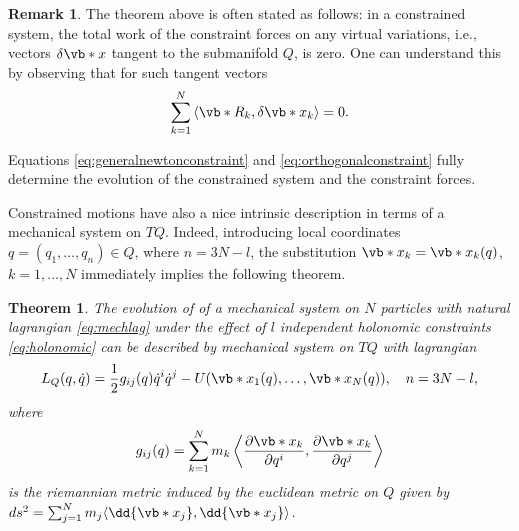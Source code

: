 \documentclass[english,fontsize=11pt,paper=b5]{scrbook}
\numberwithin{equation}{chapter}
\newtheorem{theorem}{Theorem}[chapter]
\theoremstyle{definition}
\newtheorem{remark}{Remark}[chapter]
\begin{document}
    \begin{remark}
      The theorem above is often stated as follows: in a constrained system, the total work of the constraint forces on any virtual variations, i.e., vectors $\delta\vb*{x}$ tangent to the submanifold $Q$, is zero.
      One can understand this by observing that for such tangent vectors
      \begin{equation}\label{eq:orthogonalconstraint}
        \sum_{k=1}^N \left\langle\vb*{R}_k, \delta\vb*{x}_k\right\rangle = 0.
      \end{equation}
    \end{remark}

    Equations \eqref{eq:generalnewtonconstraint} and \eqref{eq:orthogonalconstraint} fully determine the evolution of the constrained system and the constraint forces.

    Constrained motions have also a nice intrinsic description in terms of a mechanical system on $TQ$. Indeed, introducing local coordinates $q= (q_1, \ldots, q_n)\in Q$, where $n = 3N-l$, the substitution $\vb*{x}_k = \vb*{x}_k(q)$, $k=1,\ldots,N$ immediately implies the following theorem.

    \begin{theorem}
      The evolution of of a mechanical system on $N$ particles with natural lagrangian \eqref{eq:mechlag} under the effect of $l$ independent holonomic constraints \eqref{eq:holonomic} can be described by mechanical system on $TQ$ with lagrangian
      \begin{equation}
        L_Q(q,\dot q) = \frac12 g_{ij}(q)\dot q^i \dot q^j - U(\vb*{x}_1(q),\ldots,\vb*{x}_N(q)), \quad n = 3N-l,
      \end{equation}
      where
      \begin{equation}
        g_{ij}(q) = \sum_{k=1}^N m_k\left\langle\frac{\partial \vb*{x}_k}{\partial q^i},\frac{\partial \vb*{x}_k}{\partial q^j}\right\rangle
      \end{equation}
      is the riemannian metric induced by the euclidean metric on $Q$ given by
      $ds^2 = \sum_{j=1}^N m_j\langle\dd{\vb*{x}_j}, \dd{\vb*{x}_j}\rangle$.
    \end{theorem}
\end{document}
